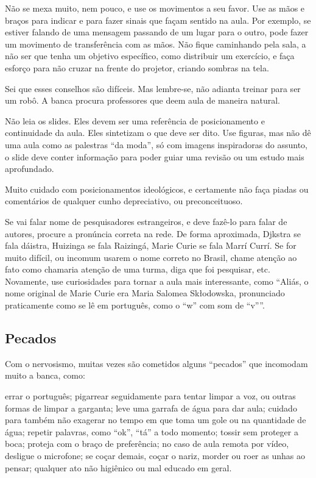 \documentclass{article}
\begin{document}
Não se mexa muito, nem pouco, e use os movimentos a seu favor.  Use as mãos e braços para indicar e para fazer sinais que façam sentido na aula. Por exemplo, se estiver falando de uma mensagem passando de um lugar para o outro, pode fazer um movimento de transferência com as mãos. Não fique caminhando pela sala, a não ser que tenha um objetivo específico, como distribuir um exercício, e faça esforço para não cruzar na frente do projetor, criando sombras na tela. 

Sei que esses conselhos são difíceis. Mas lembre-se, não adianta treinar para ser um robô. A banca procura professores que deem aula de maneira natural. 


Não leia os slides. Eles devem ser uma referência de posicionamento e continuidade da aula. Eles sintetizam o que deve ser dito. Use figuras, mas não dê uma aula como as palestras ``da moda'', só com imagens inspiradoras do assunto, o slide deve conter informação para poder guiar uma revisão ou um estudo mais aprofundado.

Muito cuidado com posicionamentos ideológicos, e certamente não faça piadas ou comentários de qualquer cunho depreciativo, ou preconceituoso. 


Se vai falar nome de pesquisadores estrangeiros, e deve fazê-lo para falar de autores, procure a pronúncia correta na rede. De forma aproximada, Djkstra se fala dáistra, Huizinga se fala Raizingá, Marie Curie se fala Marrí Currí. Se for muito difícil, ou incomum usarem o nome correto no Brasil, chame atenção ao fato como chamaria atenção de uma turma, diga que foi pesquisar, etc. Novamente, use curiosidades para tornar a aula mais interessante, como ``Aliás, o nome original de Marie Curie era Maria Salomea Sk\l odowska, pronunciado praticamente como se lê em português, como o ``w'' com som de ``v''''.

\subsection{Pecados}

Com o nervosismo, muitas vezes são cometidos alguns ``pecados'' que incomodam muito a banca, como:
\begin{outline}
\1 errar o português;
\1 pigarrear seguidamente para tentar limpar a voz, ou outras formas de limpar a garganta;
\2 leve uma garrafa de água para dar aula;
\3 cuidado para também não exagerar no tempo em que toma um gole ou na quantidade de água;
\1 repetir palavras, como ``ok'', ``tá'' a todo momento;
\1 tossir sem proteger a boca;
\2 proteja com o braço de preferência;
\2 no caso de aula remota por vídeo, desligue o microfone;
\1 se coçar demais, coçar o nariz, morder ou roer as unhas ao pensar;
\1 qualquer ato não higiênico ou mal educado em geral.
\end{outline}
\end{document}
